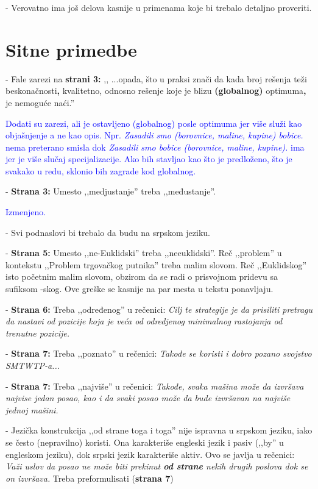 \documentclass[a4paper]{report}
\newcommand{\odgovor}[1]{\textcolor{blue}{#1}}
\begin{document}
- Verovatno ima još delova kasnije u primenama koje bi trebalo detaljno proveriti.

\section{Sitne primedbe}
- Fale zarezi na \textbf{strani 3:} ,, ...opada, što u praksi znači da kada broj rešenja teži beskonačnosti\textbf{,} kvalitetno, odnosno rešenje koje
je blizu \textbf{(globalnog)} optimuma\textbf{,} je nemoguće naći.''

\odgovor{Dodati su zarezi, ali je ostavljeno (globalnog) posle optimuma jer više služi kao objašnjenje a ne kao opis. Npr. \textit{Zasadili smo (borovnice, maline, kupine) bobice.} nema preterano smisla dok 
\textit{Zasadili smo bobice (borovnice, maline, kupine).} ima jer je više slučaj specijalizacije. Ako bih stavljao kao što je predloženo, što je svakako u redu, sklonio bih zagrade kod globalnog.\\}

- \textbf{Strana 3:} Umesto ,,medjustanje'' treba ,,međustanje''.

\odgovor{Izmenjeno.\\}

- Svi podnaslovi bi trebalo da budu na srpskom jeziku.

- \textbf{Strana 5:} Umesto ,,ne-Euklidski'' treba ,,neeuklidski''. Reč ,,problem'' u kontekstu ,,Problem trgovačkog putnika'' treba malim slovom. Reč ,,Euklidskog'' isto početnim malim slovom, obzirom da se radi o prisvojnom pridevu sa sufiksom -skog. Ove greške se kasnije na par mesta u tekstu ponavljaju.

- \textbf{Strana 6:} Treba ,,određenog'' u rečenici: {\em Cilj te strategije je da prisiliti pretragu da nastavi od pozicije koja je veća od odredjenog minimalnog rastojanja od trenutne pozicije.}

- \textbf{Strana 7:} Treba ,,poznato'' u rečenici: {\em Takođe se koristi i dobro pozano svojstvo SMTWTP-a...}

- \textbf{Strana 7:} Treba ,,najviše'' u rečenici: {\em Takođe, svaka mašina može da izvršava najvise jedan posao, kao i da svaki posao može da bude izvršavan na najviše jednoj mašini.}

- Jezička konstrukcija ,,od strane toga i toga'' nije ispravna u srpskom jeziku, iako se često (nepravilno) koristi. Ona karakteriše engleski jezik i pasiv (,,by'' u engleskom jeziku), dok srpski jezik karakteriše aktiv.
Ovo se javlja u rečenici: {\em Važi uslov da posao ne može biti prekinut \textbf{od strane} nekih drugih poslova dok se on izvršava.} Treba preformulisati (\textbf{strana 7})
\end{document}

